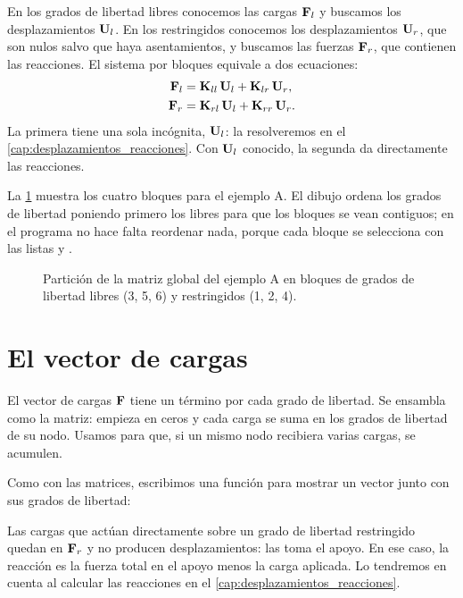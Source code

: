 En los grados de libertad libres conocemos las cargas $\mathbf{F}_l$ y buscamos los
desplazamientos $\mathbf{U}_l$. En los restringidos conocemos los desplazamientos
$\mathbf{U}_r$, que son nulos salvo que haya asentamientos, y buscamos las fuerzas
$\mathbf{F}_r$, que contienen las reacciones. El sistema por bloques equivale a dos
ecuaciones:
\begin{align}
  \mathbf{F}_l &= \mathbf{K}_{ll}\,\mathbf{U}_l + \mathbf{K}_{lr}\,\mathbf{U}_r, \label{eq:particion_libres}\\
  \mathbf{F}_r &= \mathbf{K}_{rl}\,\mathbf{U}_l + \mathbf{K}_{rr}\,\mathbf{U}_r. \label{eq:particion_restringidos}
\end{align}
La primera tiene una sola incógnita, $\mathbf{U}_l$: la resolveremos en el
\cref{cap:desplazamientos_reacciones}. Con $\mathbf{U}_l$ conocido, la segunda da
directamente las reacciones.

La \cref{fig:particion} muestra los cuatro bloques para el ejemplo A. El
dibujo ordena los grados de libertad poniendo primero los libres para que los
bloques se vean contiguos; en el programa no hace falta reordenar nada,
porque cada bloque se selecciona con las listas  y
.

\begin{figure}[ht]
  \centering
  \caption{Partición de la matriz global del ejemplo A en bloques de grados
    de libertad libres (3, 5, 6) y restringidos (1, 2, 4).}
  \label{fig:particion}
\end{figure}

\section{El vector de cargas}\label{sec:vector_cargas}

El vector de cargas $\mathbf{F}$ tiene un término por cada grado de libertad. Se
ensambla como la matriz: empieza en ceros y cada carga se suma en los grados
de libertad de su nodo. Usamos \py{+=} para que, si un mismo nodo recibiera
varias cargas, se acumulen.

Como con las matrices, escribimos una función para mostrar un vector junto
con sus grados de libertad:

\begin{cuidado}
Las cargas que actúan directamente sobre un grado de libertad restringido
quedan en $\mathbf{F}_r$ y no producen desplazamientos: las toma el apoyo. En ese
caso, la reacción es la fuerza total en el apoyo menos la carga aplicada.
Lo tendremos en cuenta al calcular las reacciones en el
\cref{cap:desplazamientos_reacciones}.
\end{cuidado}


